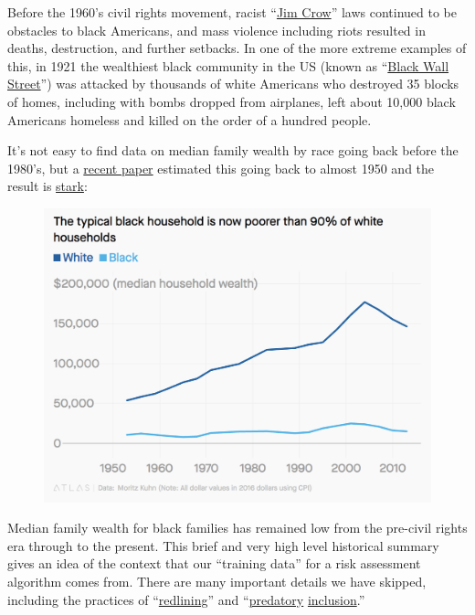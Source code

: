 \documentclass[]{book}
\theoremstyle{definition}
\theoremstyle{definition}
\theoremstyle{definition}
\theoremstyle{remark}
\begin{document}
Before the 1960's civil rights movement, racist
``\href{https://en.wikipedia.org/wiki/Jim_Crow_laws}{Jim Crow}'' laws
continued to be obstacles to black Americans, and mass violence
including riots resulted in deaths, destruction, and further setbacks.
In one of the more extreme examples of this, in 1921 the wealthiest
black community in the US (known as
``\href{https://en.wikipedia.org/wiki/Tulsa_race_riot}{Black Wall
Street}'') was attacked by thousands of white Americans who destroyed 35
blocks of homes, including with bombs dropped from airplanes, left about
10,000 black Americans homeless and killed on the order of a hundred
people.

It's not easy to find data on median family wealth by race going back
before the 1980's, but a
\href{https://www.minneapolisfed.org/research/institute-working-papers/income-and-wealth-inequality-in-america-1949-2016}{recent
paper} estimated this going back to almost 1950 and the result is
\href{https://qz.com/1368251/black-income-is-half-that-of-white-households-just-like-it-was-in-the-1950s/}{stark}:

\begin{figure}
\centering
\includegraphics{medianwealth.png}
\caption{}
\end{figure}

Median family wealth for black families has remained low from the
pre-civil rights era through to the present. This brief and very high
level historical summary gives an idea of the context that our
``training data'' for a risk assessment algorithm comes from. There are
many important details we have skipped, including the practices of
``\href{https://en.wikipedia.org/wiki/Redlining}{redlining}'' and
``\href{https://uncpress.org/book/9781469653662/race-for-profit/}{predatory}
\href{https://www.nbcnews.com/think/opinion/undermining-black-homeownership-keeanga-yamahtta-taylor-podcast-transcript-ncna1063426}{inclusion}.''
\end{document}
